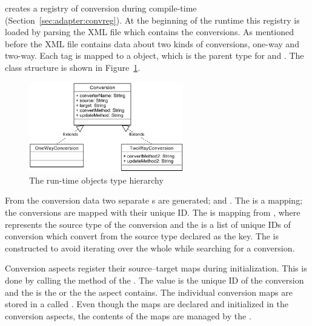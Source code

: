 \zamk creates a registry of conversion during compile-time (Section~\ref{sec:adapter:convreg}). 
At the beginning of the runtime this registry is loaded by parsing the XML file which contains the conversions. 
As mentioned before the XML file contains data about two kinds of conversions, one-way and two-way.
Each  tag is mapped to a  object, which is the parent type for  and .
The class structure is shown in Figure~\ref{fig:convclasses}.

\begin{figure}[h]
\centering
\includegraphics[width=0.6\textwidth]{chapteradapters/ConversionsUML.pdf}
\caption{The run-time  objects type hierarchy}
\label{fig:convclasses}
\end{figure}

From the conversion data two separate s are generated;  and .
The  is a  mapping; the conversions are mapped with their unique ID.  
The  is mapping from , where  represents the source type of the conversion and the  is a list of unique IDs of conversion which convert from the source type declared as the key. 
The  is constructed to avoid iterating over the whole  while searching for a conversion. 

Conversion aspects register their source--target maps during initialization.
This is done by calling the  method of the . The  value is the unique ID of the conversion and the  is the  or the  the aspect contains. 
The individual conversion maps are stored in a  called .
Even though the maps are declared and initialized in the conversion aspects, the contents of the maps are managed by the .

